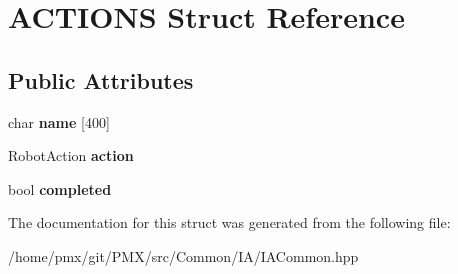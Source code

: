 \hypertarget{structACTIONS}{}\section{A\+C\+T\+I\+O\+NS Struct Reference}
\label{structACTIONS}
\subsection*{Public Attributes}
\begin{DoxyCompactItemize}
\item 
\mbox{\label{structACTIONS_a21a94bca6592f1281fa961ecec3224ce}} 
char {\bfseries name} \mbox{[}400\mbox{]}
\item 
\mbox{\label{structACTIONS_a04a21faedb62a5cda08b7cd23416d11a}} 
Robot\+Action {\bfseries action}
\item 
\mbox{\label{structACTIONS_a8bad60d082f4279e9122ef8fe7c913d0}} 
bool {\bfseries completed}
\end{DoxyCompactItemize}


The documentation for this struct was generated from the following file\+:\begin{DoxyCompactItemize}
\item 
/home/pmx/git/\+P\+M\+X/src/\+Common/\+I\+A/I\+A\+Common.\+hpp\end{DoxyCompactItemize}
